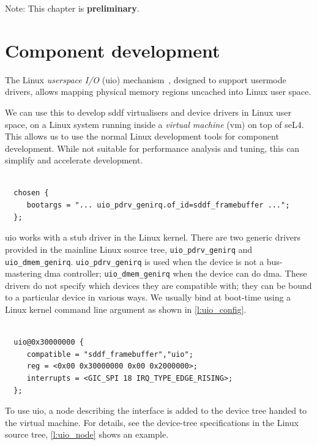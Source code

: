 \documentclass[a4paper,12pt]{report}
\newcommand{\code}[1]{\texttt{#1}}
\begin{document}
Note: This chapter is \textbf{preliminary}.

\section{Component development}

The Linux \emph{userspace I/O} (\gls{uio})
mechanism~\citep{linux:uio}, designed to support usermode drivers,
allows mapping physical memory regions uncached into Linux user space.

We can use this to develop \gls{sddf} virtualisers and device drivers in
Linux user space, on a Linux system running inside a \emph{virtual
  machine} (\gls{vm}) on top of seL4. This allows us to use the normal Linux
development tools for component development. While not suitable for
performance analysis and tuning, this can simplify and accelerate
development.


\begin{lstlisting}[gobble=2,firstline=2,float=th,tabsize=2,
  label={l:uio_config},
  caption={Example \gls{uio} stub driver command-line configurations.}]

  chosen {
     bootargs = "... uio_pdrv_genirq.of_id=sddf_framebuffer ...";
  };
\end{lstlisting}

\gls{uio} works with a stub driver in the Linux kernel.  There are two
generic drivers provided in the mainline Linux source tree,
\code{uio\_pdrv\_genirq} and \code{uio\_dmem\_genirq}.
\code{uio\_pdrv\_genirq} is used when the device is not a
bus-mastering \gls{dma} controller; \code{uio\_dmem\_genirq} when the device
can do \gls{dma}.  These drivers do not specify which devices they are
compatible with; they can be bound to a particular device in various
ways.  We usually bind at boot-time using a Linux kernel command line
argument as shown in \autoref{l:uio_config}.

\begin{lstlisting}[gobble=2,firstline=2,float=th,tabsize=2,
  label={l:uio_node},
  caption={Example \gls{uio} node in device tree.}]

  uio@0x30000000 {
     compatible = "sddf_framebuffer","uio";
     reg = <0x00 0x30000000 0x00 0x2000000>;
     interrupts = <GIC_SPI 18 IRQ_TYPE_EDGE_RISING>;
  };
\end{lstlisting}

To use \gls{uio}, a node describing the interface is added to the device
tree handed to the virtual machine.  For details, see the device-tree
specifications in the Linux source tree, \autoref{l:uio_node} shows an
example.
\end{document}
